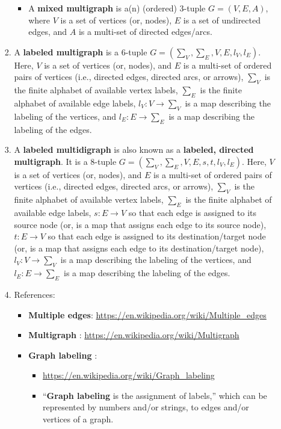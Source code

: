 \begin{enumerate}
\begin{enumerate}
\begin{enumerate}
\begin{itemize}
			\item A {\bf mixed multigraph} is a(n) (ordered) 3-tuple $G = (V, E, A)$, where $V$ is a set of vertices (or, nodes), $E$ is a set of undirected edges, and $A$ is a multi-set of directed edges/arcs.
			\end{itemize}
		\item A {\bf labeled multigraph} is a 6-tuple $G = (\sum_{V}, \sum_{E}, V, E, l_{V}, l_{E})$. Here, $V$ is a set of vertices (or, nodes), and $E$ is a multi-set of ordered pairs of vertices (i.e., directed edges, directed arcs, or arrows), $\sum_{V}$ is the finite alphabet of available vertex labels, $\sum_{E}$ is the finite alphabet of available edge labels, $l_{V} : V \rightarrow \sum_{V}$ is a map describing the labeling of the vertices, and $l_{E} : E \rightarrow \sum_{E}$ is a map describing the labeling of the edges.
		\item A {\bf labeled multidigraph} is also known as a {\bf labeled, directed multigraph}. It is a 8-tuple $G = (\sum_{V}, \sum_{E}, V, E, s, t, l_{V}, l_{E})$. Here, $V$ is a set of vertices (or, nodes), and $E$ is a multi-set of ordered pairs of vertices (i.e., directed edges, directed arcs, or arrows), $\sum_{V}$ is the finite alphabet of available vertex labels, $\sum_{E}$ is the finite alphabet of available edge labels, $s : E \rightarrow V$ so that each edge is assigned to its source node (or, is a map that assigns each edge to its source node), $t : E \rightarrow V$ so that each edge is assigned to its destination/target node (or, is a map that assigns each edge to its destination/target node), $l_{V} : V \rightarrow \sum_{V}$ is a map describing the labeling of the vertices, and $l_{E} : E \rightarrow \sum_{E}$ is a map describing the labeling of the edges.
		\item References: %
			\begin{itemize} %
			\item {\bf Multiple edges}: \url{https://en.wikipedia.org/wiki/Multiple_edges}
			\item {\bf Multigraph} \cite{WikipediaContributors2018a39}: \url{https://en.wikipedia.org/wiki/Multigraph}
			\item {\bf Graph labeling} \cite{WikipediaContributors2017a12}: %
				\begin{itemize} %
				\item \url{https://en.wikipedia.org/wiki/Graph_labeling}
				\item ``{\bf Graph labeling} is the assignment of labels,'' which can be represented by numbers and/or strings, to edges and/or vertices of a graph.

\end{itemize}
\end{itemize}
\end{enumerate}
\end{enumerate}
\end{enumerate}
